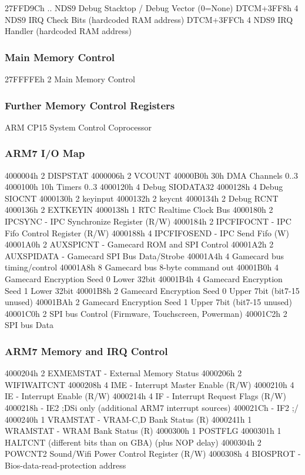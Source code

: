 \documentclass[11pt,a4paper]{proc}
\begin{document}
\begin{flushleft}
  27FFD9Ch   ..  NDS9 Debug Stacktop / Debug Vector (0=None)
  DTCM+3FF8h 4   NDS9 IRQ Check Bits (hardcoded RAM address)
  DTCM+3FFCh 4   NDS9 IRQ Handler (hardcoded RAM address)

\subsubsection{Main Memory Control}

  27FFFFEh  2    Main Memory Control

\subsubsection{Further Memory Control Registers}
ARM CP15 System Control Coprocessor

\subsubsection{ARM7 I/O Map}

  4000004h  2   DISPSTAT
  4000006h  2   VCOUNT
  40000B0h  30h DMA Channels 0..3
  4000100h  10h Timers 0..3
  4000120h  4   Debug SIODATA32
  4000128h  4   Debug SIOCNT
  4000130h  2   keyinput
  4000132h  2   keycnt
  4000134h  2   Debug RCNT
  4000136h  2   EXTKEYIN
  4000138h  1   RTC Realtime Clock Bus
  4000180h  2   IPCSYNC - IPC Synchronize Register (R/W)
  4000184h  2   IPCFIFOCNT - IPC Fifo Control Register (R/W)
  4000188h  4   IPCFIFOSEND - IPC Send Fifo (W)
  40001A0h  2   AUXSPICNT - Gamecard ROM and SPI Control
  40001A2h  2   AUXSPIDATA - Gamecard SPI Bus Data/Strobe
  40001A4h  4   Gamecard bus timing/control
  40001A8h  8   Gamecard bus 8-byte command out
  40001B0h  4   Gamecard Encryption Seed 0 Lower 32bit
  40001B4h  4   Gamecard Encryption Seed 1 Lower 32bit
  40001B8h  2   Gamecard Encryption Seed 0 Upper 7bit (bit7-15 unused)
  40001BAh  2   Gamecard Encryption Seed 1 Upper 7bit (bit7-15 unused)
  40001C0h  2   SPI bus Control (Firmware, Touchscreen, Powerman)
  40001C2h  2   SPI bus Data

\subsubsection{ARM7 Memory and IRQ Control}

  4000204h  2   EXMEMSTAT - External Memory Status
  4000206h  2   WIFIWAITCNT
  4000208h  4   IME - Interrupt Master Enable (R/W)
  4000210h  4   IE  - Interrupt Enable (R/W)
  4000214h  4   IF  - Interrupt Request Flags (R/W)
  4000218h  -   IE2  ;DSi only (additional ARM7 interrupt sources)
  400021Ch  -   IF2  ;/
  4000240h  1   VRAMSTAT - VRAM-C,D Bank Status (R)
  4000241h  1   WRAMSTAT - WRAM Bank Status (R)
  4000300h  1   POSTFLG
  4000301h  1   HALTCNT (different bits than on GBA) (plus NOP delay)
  4000304h  2   POWCNT2  Sound/Wifi Power Control Register (R/W)
  4000308h  4   BIOSPROT - Bios-data-read-protection address


\end{flushleft}
\end{document}
